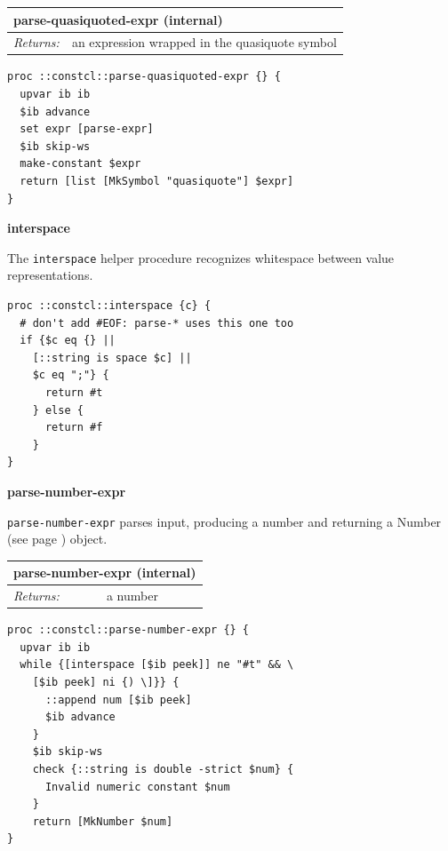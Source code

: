 \documentclass[twoside,9pt]{report}
\begin{document}
\begin{tabular}{ |l l| }
\hline
\multicolumn{2}{|l|}{parse-quasiquoted-expr (internal)} \\
\hline
\textit{Returns:} & an expression wrapped in the quasiquote symbol \\
\hline
\end{tabular}

\noindent\makebox[\linewidth]{\rule{\linewidth}{0.4pt}}
\begin{lstlisting}
proc ::constcl::parse-quasiquoted-expr {} {
  upvar ib ib
  $ib advance
  set expr [parse-expr]
  $ib skip-ws
  make-constant $expr
  return [list [MkSymbol "quasiquote"] $expr]
}
\end{lstlisting}
\noindent\makebox[\linewidth]{\rule{\linewidth}{0.4pt}}

\textbf{interspace}


The \texttt{interspace} helper procedure recognizes whitespace between value representations.

\noindent\makebox[\linewidth]{\rule{\linewidth}{0.4pt}}
\begin{lstlisting}
proc ::constcl::interspace {c} {
  # don't add #EOF: parse-* uses this one too
  if {$c eq {} ||
    [::string is space $c] ||
    $c eq ";"} {
      return #t
    } else {
      return #f
    }
}
\end{lstlisting}
\noindent\makebox[\linewidth]{\rule{\linewidth}{0.4pt}}

\textbf{parse-number-expr}


\texttt{parse-number-expr} parses input, producing a number and returning a Number (see page \pageref{numbers}) object.

\begin{tabular}{ |l l| }
\hline
\multicolumn{2}{|l|}{parse-number-expr (internal)} \\
\hline
\textit{Returns:} & a number \\
\hline
\end{tabular}

\noindent\makebox[\linewidth]{\rule{\linewidth}{0.4pt}}
\begin{lstlisting}
proc ::constcl::parse-number-expr {} {
  upvar ib ib
  while {[interspace [$ib peek]] ne "#t" && \
    [$ib peek] ni {) \]}} {
      ::append num [$ib peek]
      $ib advance
    }
    $ib skip-ws
    check {::string is double -strict $num} {
      Invalid numeric constant $num
    }
    return [MkNumber $num]
}
\end{lstlisting}
\noindent\makebox[\linewidth]{\rule{\linewidth}{0.4pt}}
\end{document}
